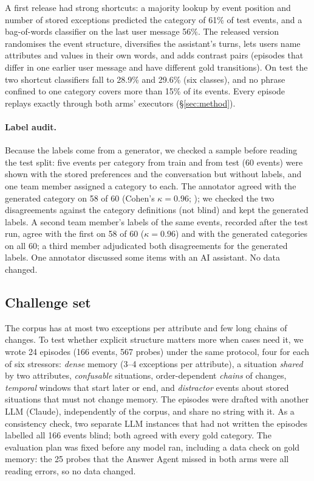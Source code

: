 \documentclass[11pt]{article}
\begin{document}
A first release had strong shortcuts: a majority lookup by event position and number of stored exceptions predicted the category of 61\% of test events, and a bag-of-words classifier on the last user message 56\%. The released version randomises the event structure, diversifies the assistant's turns, lets users name attributes and values in their own words, and adds contrast pairs (episodes that differ in one earlier user message and have different gold transitions). On test the two shortcut classifiers fall to 28.9\% and 29.6\% (six classes), and no phrase confined to one category covers more than 15\% of its events. Every episode replays exactly through both arms' executors (\S\ref{sec:method}).

\paragraph{Label audit.} Because the labels come from a generator, we checked a sample before reading the test split: five events per category from train and from test (60 events) were shown with the stored preferences and the conversation but without labels, and one team member assigned a category to each. The annotator agreed with the generated category on 58 of 60 (Cohen's $\kappa=0.96$; \citealp{cohen1960kappa}); we checked the two disagreements against the category definitions (not blind) and kept the generated labels. A second team member's labels of the same events, recorded after the test run, agree with the first on 58 of 60 ($\kappa=0.96$) and with the generated categories on all 60; a third member adjudicated both disagreements for the generated labels. One annotator discussed some items with an AI assistant. No data changed.

\subsection{Challenge set}
The corpus has at most two exceptions per attribute and few long chains of changes. To test whether explicit structure matters more when cases need it, we wrote 24 episodes (166 events, 567 probes) under the same protocol, four for each of six stressors: \emph{dense} memory (3--4 exceptions per attribute), a situation \emph{shared} by two attributes, \emph{confusable} situations, order-dependent \emph{chains} of changes, \emph{temporal} windows that start later or end, and \emph{distractor} events about stored situations that must not change memory. The episodes were drafted with another LLM (Claude), independently of the corpus, and share no string with it. As a consistency check, two separate LLM instances that had not written the episodes labelled all 166 events blind; both agreed with every gold category. The evaluation plan was fixed before any model ran, including a data check on gold memory: the 25 probes that the Answer Agent missed in both arms were all reading errors, so no data changed.
\end{document}

